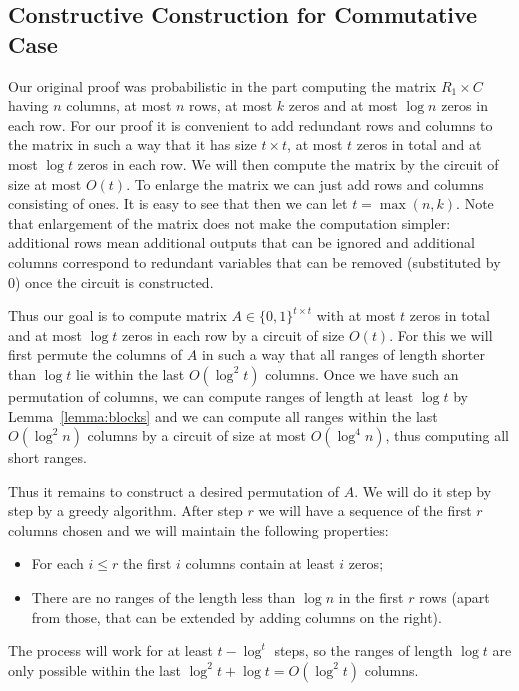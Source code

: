 
\subsection{Constructive Construction for Commutative Case}\label{subsec:constructive}

Our original proof was probabilistic in the part computing the matrix $R_1 \times C$ having $n$ columns, at most $n$ rows, at most $k$ zeros and at most $\log n$ zeros in each row. For our proof it is convenient to add redundant rows and columns to the matrix in such a way that it has size $t \times t$, at most $t$ zeros in total and at most $\log t$ zeros in each row. We will then compute the matrix by the circuit of size at most $O(t)$. To enlarge the matrix we can just add rows and columns consisting of ones. It is easy to see that then we can let $t = \max(n,k)$. Note that enlargement of the matrix does not make the computation simpler: additional rows mean additional outputs that can be ignored and additional columns correspond to redundant variables that can be removed (substituted by 0) once the circuit is constructed.

Thus our goal is to compute matrix $A \in \{0,1\}^{t\times t}$ with at most $t$ zeros in total and at most $\log t$ zeros in each row by a circuit of size $O(t)$. For this we will first permute the columns of $A$ in such a way that all ranges of length shorter than $\log t$ lie within the last $O(\log^2 t)$ columns. Once we have such an permutation of columns, we can compute ranges of length at least $\log t$ by Lemma~\ref{lemma:blocks} and we can compute all ranges within the last $O(\log^2 n)$ columns by a circuit of size at most $O(\log^4 n)$, thus computing all short ranges. 

Thus it remains to construct a desired permutation of $A$. We will do it step by step by a greedy algorithm. After step $r$ we will have a sequence of the first $r$ columns chosen and we will maintain the following properties:
\begin{itemize}
\item For each $i \leq r$ the first $i$ columns contain at least $i$ zeros;
\item There are no ranges of the length less than $\log n$ in the first $r$ rows (apart from those, that can be extended by adding columns on the right).
\end{itemize}
The process will work for at least $t - \log^ t$ steps, so the ranges of length $\log t$ are only possible within the last $\log^2 t + \log t = O(\log^2 t)$ columns.

